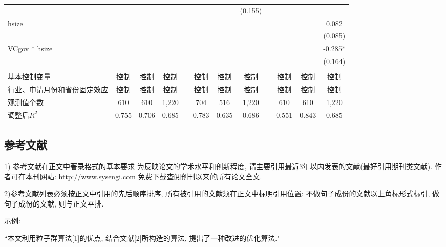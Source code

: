 \documentclass{setp-new}
\begin{document}
\begin{landscape}
\begin{table}[h]
\begin{tabular}{p{2.5cm}<{\raggedright} ccccccccccc}
          &       &       &       &       &       &       & (0.155) &       &       &       & \multicolumn{1}{l}{} \\
    hsize &       &       &       &       &       &       & \multicolumn{1}{l}{} &       &       &       & 0.082 \\
          &       &       &       &       &       &       & \multicolumn{1}{l}{} &       &       &       & (0.085) \\
   VCgov * hsize &       &       &       &       &       &       & \multicolumn{1}{l}{} &       &       &       & -0.285* \\
          &       &       &       &       &       &       & \multicolumn{1}{l}{} &       &       &       & (0.164) \\
          &       &       &       &       &       &       &       &       &       &       &  \\
    基本控制变量 & 控制    & 控制    & 控制    &       & 控制    & 控制    & 控制    &       & 控制    & 控制    & 控制 \\
    行业、申请月份和省份固定效应 & 控制    & 控制    & 控制    &       & 控制    & 控制    & 控制    &       & 控制    & 控制    & 控制 \\
    观测值个数 & 610   & 610   & 1,220 &       & 704   & 516   & 1,220 &       & 610   & 610   & 1,220 \\
    调整后$R^2$ & 0.755 & 0.706 & 0.685 &       & 0.783 & 0.635 & 0.686 &       & 0.551 & 0.843 & 0.685 \\
    \bottomrule
    \end{tabular}%
\end{table}
\end{landscape}



\subsection{参考文献}


1) 参考文献在正文中著录格式的基本要求
为反映论文的学术水平和创新程度, 请主要引用最近3年以内发表的文献(最好引用期刊类文献). 作者可在本刊网站: http://www.sysengi.com 免费下载查阅创刊以来的所有论文全文.

2)参考文献列表必须按正文中引用的先后顺序排序, 所有被引用的文献须在正文中标明引用位置: 不做句子成份的文献以上角标形式标引, 做句子成份的文献, 则与正文平排.

示例:

``本文利用粒子群算法[1]的优点, 结合文献[2]所构造的算法, 提出了一种改进的优化算法."
\end{document}
